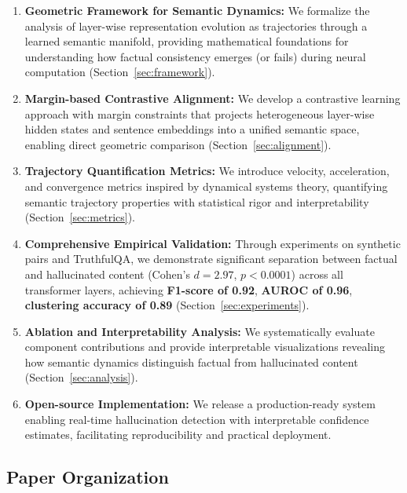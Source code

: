 \documentclass[11pt]{article}
\begin{document}
\begin{enumerate}[leftmargin=*]
    \item \textbf{Geometric Framework for Semantic Dynamics:} We formalize the analysis of layer-wise representation evolution as trajectories through a learned semantic manifold, providing mathematical foundations for understanding how factual consistency emerges (or fails) during neural computation (Section~\ref{sec:framework}).
    
    \item \textbf{Margin-based Contrastive Alignment:} We develop a contrastive learning approach with margin constraints that projects heterogeneous layer-wise hidden states and sentence embeddings into a unified semantic space, enabling direct geometric comparison (Section~\ref{sec:alignment}).
    
    \item \textbf{Trajectory Quantification Metrics:} We introduce velocity, acceleration, and convergence metrics inspired by dynamical systems theory, quantifying semantic trajectory properties with statistical rigor and interpretability (Section~\ref{sec:metrics}).
    
    \item \textbf{Comprehensive Empirical Validation:} Through experiments on synthetic pairs and TruthfulQA, we demonstrate significant separation between factual and hallucinated content (Cohen's $d = 2.97$, $p < 0.0001$) across all transformer layers, achieving \textbf{F1-score of 0.92}, \textbf{AUROC of 0.96},  \textbf{clustering accuracy of 0.89 }(Section~\ref{sec:experiments}).
    
    \item \textbf{Ablation and Interpretability Analysis:} We systematically evaluate component contributions and provide interpretable visualizations revealing how semantic dynamics distinguish factual from hallucinated content (Section~\ref{sec:analysis}).
    
    \item \textbf{Open-source Implementation:} We release a production-ready system enabling real-time hallucination detection with interpretable confidence estimates, facilitating reproducibility and practical deployment.
\end{enumerate}

\subsection{Paper Organization}
\end{document}
